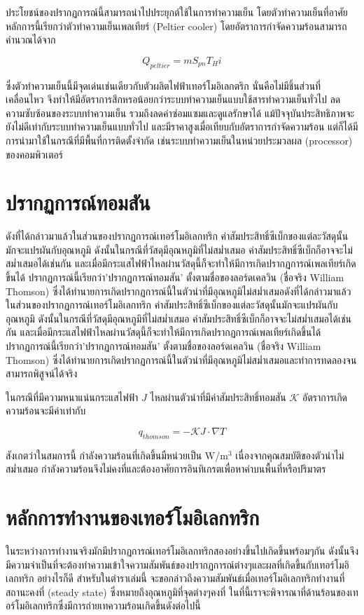\documentclass[a4paper,nobib,openany,10pt]{tufte-book}
\begin{document}
ประโยชน์ของปรากฏการณ์นี้สามารถนำไปประยุกต์ใช้ในการทำความเย็น โดยตัวทำความเย็นที่อาศัยหลักการนี้เรียกว่าตัวทำความเย็นเพลเทียร์ (Peltier cooler) โดยอัตราการกำจัดความร้อนสามารถคำนวณได้จาก

\begin{equation}
  Q_{peltier} = m S_{pn} T_H i
\end{equation}

ซึ่งตัวทำความเย็นนี้มีจุดเด่นเช่นเดียวกับตัวผลิตไฟฟ้าเทอร์โมอิเลกตริก
นั่นคือไม่มีชิ้นส่วนที่เคลื่อนไหว
จึงทำให้มีอัตราการสึกหรอน้อยกว่าระบบทำความเย็นแบบใช้สารทำความเย็นทั่วไป
ลดความซับซ้อนของระบบทำความเย็น รวมถึงลดค่าซ่อมแซมและดูแลรักษาได้
แม้ปัจจุบันประสิทธิภาพจะยังไม่ดีเท่ากับระบบทำความเย็นแบบทั่วไป
และมีราคาสูงเมื่อเทียบกับอัตราการกำจัดความร้อน
แต่ก็ได้มีการนำมาใช้ในกรณีที่มีพื้นที่การติดตั้งจำกัด
เช่นระบบทำความเย็นในหน่วยประมวลผล (processor) ของคอมพิวเตอร์

\section{ปรากฏการณ์ทอมสัน}
\label{sec:org1a16456}
ดังที่ได้กล่าวมาแล้วในส่วนของปรากฏการณ์เทอร์โมอิเลกทริก
ค่าสัมประสิทธิ์ซีเบ็กของแต่ละวัสดุนั้นมักจะแปรผันกับอุณหภูมิ
ดังนั้นในกรณีที่วัสดุมีอุณหภูมิที่ไม่สม่ำเสมอ
ค่าสัมประสิทธิ์ซีเบ็กก็อาจจะไม่สม่ำเสมอได้เช่นกัน
และเมื่อมีกระแสไฟฟ้าไหลผ่านวัสดุนี้ก็จะทำให้มีการเกิดปรากฏการณ์เพลเทียร์เกิดขึ้นได้
ปรากฏการณ์นี้เรียกว่า'ปรากฏการณ์ทอมสัน' ตั้งตามชื่อของลอร์ดเคลวิน
(ชื่อจริง William Thomson)
ซึ่งได้ทำนายการเกิดปรากฏการณ์นี้ในตัวนำที่มีอุณหภูมิไม่สม่ำเสมอดังที่ได้กล่าวมาแล้วในส่วนของปรากฏการณ์เทอร์โมอิเลกทริก
ค่าสัมประสิทธิ์ซีเบ็กของแต่ละวัสดุนั้นมักจะแปรผันกับอุณหภูมิ
ดังนั้นในกรณีที่วัสดุมีอุณหภูมิที่ไม่สม่ำเสมอ
ค่าสัมประสิทธิ์ซีเบ็กก็อาจจะไม่สม่ำเสมอได้เช่นกัน
และเมื่อมีกระแสไฟฟ้าไหลผ่านวัสดุนี้ก็จะทำให้มีการเกิดปรากฏการณ์เพลเทียร์เกิดขึ้นได้
ปรากฏการณ์นี้เรียกว่า'ปรากฏการณ์ทอมสัน' ตั้งตามชื่อของลอร์ดเคลวิน
(ชื่อจริง William Thomson)
ซึ่งได้ทำนายการเกิดปรากฏการณ์นี้ในตัวนำที่มีอุณหภูมิไม่สม่ำเสมอและทำการทดลองจนสามารถพิสูจน์ได้จริง

ในกรณีที่มีความหนาแน่นกระแสไฟฟ้า \(J\)
ไหลผ่านตัวนำที่มีค่าสัมประสิทธิ์ทอมสัน \(\mathcal{K}\)
อัตราการเกิดความร้อนจะมีค่าเท่ากับ

\[q_{thomson} = - \mathcal{K} J \cdot \nabla T\]

สังเกตว่าในสมการนี้ กำลังความร้อนที่เกิดขึ้นมืหน่วยเป็น W/m\(^3\)
เนื่องจากคุณสมบัติของตัวนำไม่สม่ำเสมอ
กำลังความร้อนจึงไม่คงที่และต้องอาศัยการอินทิเกรตเพื่อหาค่าบนพื้นที่หรือปริมาตร

\section{หลักการทำงานของเทอร์โมอิเลกทริก}
\label{sec:org5e907ec}
ในระหว่างการทำงานจริงมักมีปรากฏการณ์เทอร์โมอิเลกทริกสองอย่างขึ้นไปเกิดขึ้นพร้อมๆกัน
ดังนั้นจึงมีความจำเป็นที่จะต้องทำความเข้าใจความสัมพันธ์ของปรากฏการณ์ต่างๆและผลที่เกิดขึ้นกับเทอร์โมอิเลกทริก
อย่างไรก็ดี สำหรับในตำราเล่มนี้
จะขอกล่าวถึงความสัมพันธ์เมื่อเทอร์โมอิเลกทริกทำงานที่สถานะคงที่ (steady
state) ซึ่งหมายถึงอุณหภูมิที่จุดต่างๆคงที่
ในที่นี้เราจะพิจารณาที่ด้านร้อนของเทอร์โมอิเลกทริกซึ่งมีการถ่ายเทความร้อนเกิดขึ้นดังต่อไปนี้
\end{document}
